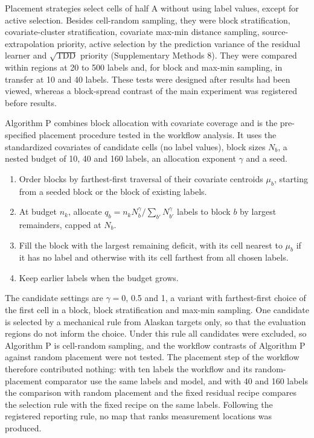Placement strategies select cells of half A without using label values, except for active selection. Besides cell-random sampling, they were block stratification, covariate-cluster stratification, covariate max-min distance sampling, source-extrapolation priority, active selection by the prediction variance of the residual learner and $\sqrt{\mathrm{TDD}}$ priority (Supplementary Methods 8). They were compared within regions at 20 to 500 labels and, for block and max-min sampling, in transfer at 10 and 40 labels. These tests were designed after results had been viewed, whereas a block-spread contrast of the main experiment was registered before results.

Algorithm P combines block allocation with covariate coverage and is the pre-specified placement procedure tested in the workflow analysis. It uses the standardized covariates of candidate cells (no label values), block sizes $N_b$, a nested budget of 10, 40 and 160 labels, an allocation exponent $\gamma$ and a seed.
\begin{enumerate}
\item Order blocks by farthest-first traversal of their covariate centroids $\mu_b$, starting from a seeded block or the block of existing labels.
\item At budget $n_k$, allocate $q_b = n_k N_b^{\gamma} / \sum_{b'} N_{b'}^{\gamma}$ labels to block $b$ by largest remainders, capped at $N_b$.
\item Fill the block with the largest remaining deficit, with its cell nearest to $\mu_b$ if it has no label and otherwise with its cell farthest from all chosen labels.
\item Keep earlier labels when the budget grows.
\end{enumerate}
The candidate settings are $\gamma = 0$, 0.5 and 1, a variant with farthest-first choice of the first cell in a block, block stratification and max-min sampling. One candidate is selected by a mechanical rule from Alaskan targets only, so that the evaluation regions do not inform the choice. Under this rule all candidates were excluded, so Algorithm P is cell-random sampling, and the workflow contrasts of Algorithm P against random placement were not tested. The placement step of the workflow therefore contributed nothing: with ten labels the workflow and its random-placement comparator use the same labels and model, and with 40 and 160 labels the comparison with random placement and the fixed residual recipe compares the selection rule with the fixed recipe on the same labels. Following the registered reporting rule, no map that ranks measurement locations was produced.

